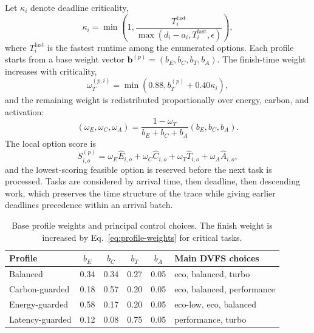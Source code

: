 Let $\kappa_i$ denote deadline criticality,
\begin{equation}
\kappa_i=\min\left(1,\frac{T^{\mathrm{fast}}_i}{\max(d_i-a_i,T^{\mathrm{fast}}_i,\epsilon)}\right),
\label{eq:criticality}
\end{equation}
where $T^{\mathrm{fast}}_i$ is the fastest runtime among the enumerated options. Each profile starts from a base weight vector $\mathbf{b}^{(p)}=(b_E,b_C,b_T,b_A)$. The finish-time weight increases with criticality,
\begin{equation}
\omega_T^{(p,i)}=\min\left(0.88,b_T^{(p)}+0.40\kappa_i\right),
\end{equation}
and the remaining weight is redistributed proportionally over energy, carbon, and activation:
\begin{equation}
(\omega_E,\omega_C,\omega_A)=
\frac{1-\omega_T}{b_E+b_C+b_A}(b_E,b_C,b_A).
\label{eq:profile-weights}
\end{equation}
The local option score is
\begin{equation}
S_{i,o}^{(p)}=\omega_E \hat{E}_{i,o}+\omega_C \hat{C}_{i,o}+\omega_T \hat{T}_{i,o}+\omega_A \hat{A}_{i,o},
\label{eq:local-score}
\end{equation}
and the lowest-scoring feasible option is reserved before the next task is processed. Tasks are considered by arrival time, then deadline, then descending work, which preserves the time structure of the trace while giving earlier deadlines precedence within an arrival batch.

\begin{table}[t]
\centering
\caption{Base profile weights and principal control choices. The finish weight is increased by Eq.~\eqref{eq:profile-weights} for critical tasks.}
\label{tab:profiles}
\scriptsize
\setlength{\tabcolsep}{3.5pt}
\begin{tabularx}{\linewidth}{lccccY}
\toprule
Profile & $b_E$ & $b_C$ & $b_T$ & $b_A$ & Main DVFS choices \\
\midrule
Balanced & 0.34 & 0.34 & 0.27 & 0.05 & eco, balanced, turbo \\
Carbon-guarded & 0.18 & 0.57 & 0.20 & 0.05 & eco, balanced, performance \\
Energy-guarded & 0.58 & 0.17 & 0.20 & 0.05 & eco-low, eco, balanced \\
Latency-guarded & 0.12 & 0.08 & 0.75 & 0.05 & performance, turbo \\
\bottomrule
\end{tabularx}
\end{table}

